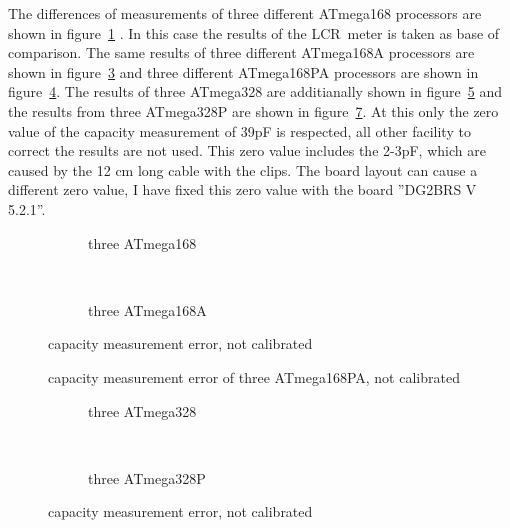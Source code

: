 The differences of measurements of three different ATmega168 processors are shown in figure~\ref{fig:mega168all} .
In this case the results of the LCR~meter is taken as base of comparison.
The same results of three different ATmega168A processors are shown in figure~\ref{fig:mega168Aall} and
three different ATmega168PA processors are shown in figure~\ref{fig:mega168PAall}.
The results of three ATmega328 are additianally shown in figure~\ref{fig:mega328all} and the results from three
ATmega328P are shown in figure~\ref{fig:mega328Pall}.
At this only the zero value of the capacity measurement of 39pF is respected, all other facility to correct the results are
not used.
This zero value includes the 2-3pF, which are caused by the 12 cm long cable with the clips.
The board layout can cause a different zero value, I have fixed this zero value with the board ''DG2BRS V 5.2.1''.

\begin{figure}[H]
  \begin{subfigure}[b]{9cm}
    \centering
    \resizebox{9cm}{!}{}
    \caption{three ATmega168}
    \label{fig:mega168all}
  \end{subfigure}
  ~
  \begin{subfigure}[b]{9cm}
    \centering
    \resizebox{9cm}{!}{}
    \caption{three ATmega168A}
    \label{fig:mega168Aall}
  \end{subfigure}
\caption{capacity measurement error, not calibrated}
\end{figure}

\begin{figure}[H]
\centering

\caption{capacity measurement error of three ATmega168PA, not calibrated}
\label{fig:mega168PAall}
\end{figure}

\begin{figure}[H]
  \begin{subfigure}[b]{9cm}
    \centering
    \resizebox{9cm}{!}{}
    \caption{three ATmega328}
    \label{fig:mega328all}
  \end{subfigure}
  ~
  \begin{subfigure}[b]{9cm}
    \centering
    \resizebox{9cm}{!}{}
    \caption{three ATmega328P}
    \label{fig:mega328Pall}
  \end{subfigure}
\caption{capacity measurement error, not calibrated}
\end{figure}

